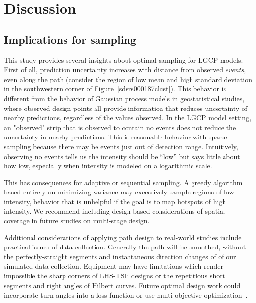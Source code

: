 \documentclass[review]{elsarticle}
\begin{document}
\section{Discussion}

\subsection{Implications for sampling}

This study provides several insights about optimal sampling for LGCP models.
First of all, prediction uncertainty increases with distance from observed
\emph{events}, even along the path (consider the region of low mean and high
standard deviation in the southwestern corner of
Figure~\ref{sdsrs000187clust}). This behavior is different from the behavior
of Gaussian process models in geostatistical studies, where observed design
points all provide information that reduces uncertainty of nearby predictions,
regardless of the values observed. In the LGCP model setting, an "observed"
strip that is observed to contain no events does not reduce the uncertainty in
nearby predictions. This is reasonable behavior with sparse sampling because
there may be events just out of detection range. Intuitively, observing no
events tells us the intensity should be ``low'' but says little about how low,
especially when intensity is modeled on a logarithmic scale.

This has consequences for adaptive or sequential sampling. A greedy algorithm
based entirely on minimizing variance may excessively sample regions of low
intensity, behavior that is unhelpful if the goal is to map hotspots of high
intensity. We recommend including design-based considerations of spatial
coverage in future studies on multi-stage design.

Additional considerations of applying path design to real-world studies include
practical issues of data collection. Generally the path will be smoothed,
without the perfectly-straight segments and instantaneous direction changes of
of our simulated data collection. Equipment may have limitations which render
impossible the sharp corners of LHS-TSP designs or the repetitious short
segments and right angles of Hilbert curves. Future optimal design work could
incorporate turn angles into a loss function or use multi-objective
optimization~\citep{lark}.
\end{document}
